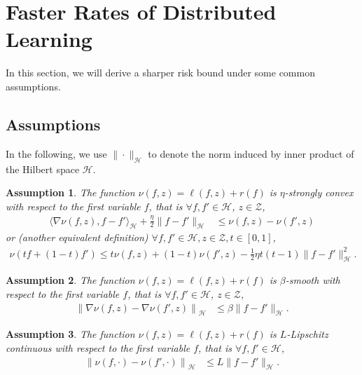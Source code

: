 \documentclass{article}
\newtheorem{assumption}{Assumption}
\begin{document}
\section{Faster Rates of Distributed Learning}
In this section, we will derive a sharper risk bound under some common assumptions.
\subsection{Assumptions}
In the following, we use $\|\cdot\|_\mathcal{H}$ to denote the norm induced by inner product of the Hilbert space $\mathcal{H}$.
\begin{assumption}
\label{assumption-strongly}
  The function $\nu(f,z)=\ell(f,z)+r(f)$ is $\eta$-strongly convex with respect to the first variable $f$,
  that is $\forall f,f'\in\mathcal{H}$, $z\in\mathcal{Z}$,
  \begin{align}
    \label{assumption-strongly-equation}
     \langle \nabla \nu(f,z), f-f'\rangle_\mathcal{H}+\frac{\eta}{2}\|f-f'\|_\mathcal{H} &\leq \nu(f,z)-\nu(f',z)
  \end{align}
  or (another equivalent definition)
  $\forall  f,f'\in\mathcal{H}, z\in\mathcal{Z}, t\in[0,1]$,
  \begin{align}
  \label{assumption-strongly-second}
  \nu(tf+(1-t)f') \leq  t\nu(f,z)+(1-t)\nu(f',z)-\frac{1}{2}\eta t(t-1)\|f-f'\|_\mathcal{H}^2.
  \end{align}
\end{assumption}
\begin{assumption}
\label{assumption-smooth}
  The function $\nu(f,z)=\ell(f,z)+r(f)$ is $\beta$-smooth with respect to the first variable $f$,
  that is $\forall f,f'\in\mathcal{H}$, $z\in\mathcal{Z}$,
  \begin{align}
     \label{assumption-smooth-equaiton}
     \left\|\nabla\nu(f,z)-\nabla \nu(f',z)\right\|_\mathcal{H}&\leq \beta\|f-f'\|_\mathcal{H}.
  \end{align}
\end{assumption}

\begin{assumption}
\label{assumption-libs}
  The function $\nu(f,z)=\ell(f,z)+r(f)$ is $L$-Lipschitz continuous with respect to the first variable $f$,
  that is $\forall f,f'\in\mathcal{H}$,
  \begin{align}
     \label{assumption-libs-equation}
     \left\|\nu(f,\cdot)- \nu(f',\cdot)\right\|_\mathcal{H}&\leq L\|f-f'\|_\mathcal{H}.
  \end{align}
\end{assumption}
\end{document}
